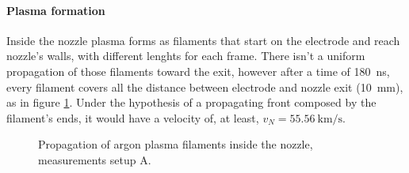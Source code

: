 \paragraph{Plasma formation}
Inside the nozzle plasma forms as filaments that start on the electrode and reach nozzle's walls, with different lenghts for each frame. There isn't a uniform propagation of those filaments toward the exit, however after a time of \SI{180}{\nano\second}, every filament covers all the distance between electrode and nozzle exit (\SI{10}{\milli\meter}), as in figure \ref{fig:arnoz_prop}. Under the hypothesis of a propagating front composed by the filament's ends, it would have a velocity of, at least, $v_{N} = \SI{55.56}{\kilo\meter/\second}$. 
\begin{figure}
 \centering
 
 
 \caption{Propagation of argon plasma filaments inside the nozzle, measurements setup A.}
 \label{fig:arnoz_prop}
\end{figure}

